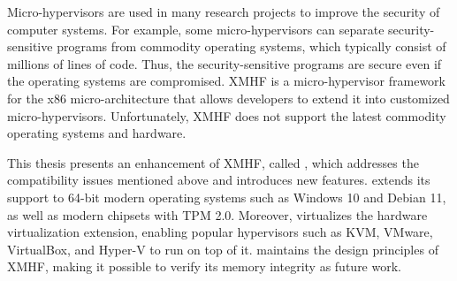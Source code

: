 \abstract

Micro-hypervisors are used in many research projects to improve the security of computer systems. For example, some micro-hypervisors can separate security-sensitive programs from commodity operating systems, which typically consist of millions of lines of code. Thus, the security-sensitive programs are secure even if the operating systems are compromised. XMHF is a micro-hypervisor framework for the x86 micro-architecture that allows developers to extend it into customized micro-hypervisors. Unfortunately, XMHF does not support the latest commodity operating systems and hardware.

This thesis presents an enhancement of XMHF, called , which addresses the compatibility issues mentioned above and introduces new features.  extends its support to 64-bit modern operating systems such as Windows 10 and Debian 11, as well as modern chipsets with TPM 2.0. Moreover,  virtualizes the hardware virtualization extension, enabling popular hypervisors such as KVM, VMware, VirtualBox, and Hyper-V to run on top of it.  maintains the design principles of XMHF, making it possible to verify its memory integrity as future work.

